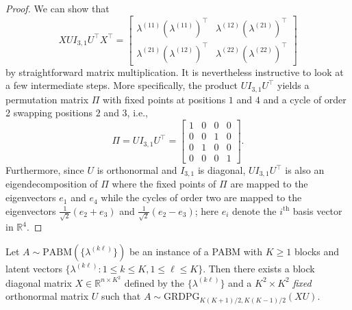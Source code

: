 \documentclass[12pt]{article}
\begin{document}
\begin{proof}
  We can show that
\[X U I_{3, 1} U^\top X^\top =
\begin{bmatrix}
  \lambda^{(11)} (\lambda^{(11)})^\top & \lambda^{(12)} (\lambda^{(21)})^\top \\
  \lambda^{(21)} (\lambda^{(12)})^\top & \lambda^{(22)} (\lambda^{(22)})^\top
\end{bmatrix} \]
by straightforward matrix multiplication. It is nevertheless
instructive to look at a few intermediate steps. More specifically,
the product $U I_{3, 1} U^\top$ yields a permutation matrix $\Pi$
with fixed points at positions $1$ and $4$ and a cycle of order 2 swapping
positions $2$ and $3$, i.e., 
$$\Pi = U I_{3, 1} U^\top = \begin{bmatrix} 1 & 0 & 0 & 0 \\
  0 & 0 & 1 & 0 \\
  0 & 1 & 0 & 0 \\
  0 & 0 & 0 & 1
\end{bmatrix}.$$
Furthermore, since $U$ is orthonormal and $I_{3, 1}$ is diagonal, $U I_{3, 1} U^\top$
is also an eigendecomposition of $\Pi$ where the fixed
points of $\Pi$ are mapped to the eigenvectors $e_1$ and $e_4$
while the cycles of order two are mapped to the eigenvectors  
$\tfrac{1}{\sqrt{2}}(e_{2} + e_3)$ and $\tfrac{1}{\sqrt{2}}(e_{2} -
e_3)$; here $e_i$ denote the $i^\mathrm{th}$ basis vector in $\mathbb{R}^{4}$.
\end{proof}

\begin{theorem}[Generalization to $K > 2$]
\label{theorem2}
Let $A \sim \mathrm{PABM}(\{\lambda^{(k \ell)}\})$ be an instance of a
PABM with $K \geq 1$ blocks and latent vectors $\{\lambda^{(k \ell)}
\colon 1 \leq k \leq K, 1 \leq \ell \leq K\}$. Then there exists a block diagonal matrix
$X \in \mathbb{R}^{n \times K^2}$ defined by the $\{\lambda^{(k \ell)}\}$ and a $K^2 \times
K^2$ {\em fixed} orthonormal matrix $U$ such 
that $A \sim \mathrm{GRDPG}_{K (K+1) / 2, K (K-1) / 2}(XU)$.
\end{theorem}
\end{document}
